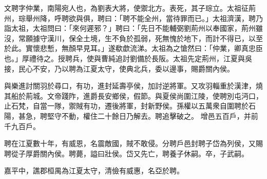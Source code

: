 \begin{pinyinscope}
 
 
 文聘字仲業，南陽宛人也，為劉表大將，使禦北方。表死，其子琮立。太祖征荊州，琮舉州降，呼聘欲與俱，聘曰：「聘不能全州，當待罪而已。」太祖濟漢，聘乃詣太祖，太祖問曰：「來何遲邪？」聘曰：「先日不能輔弼劉荊州以奉國家，荊州雖沒，常願據守漢川，保全土境，生不負於孤弱，死無愧於地下，而計不得已，以至於此。實懷悲慙，無顏早見耳。」遂欷歔流涕。太祖為之愴然曰：「仲業，卿真忠臣也。」厚禮待之。授聘兵，使與曹純追討劉備於長阪。太祖先定荊州，江夏與吳接，民心不安，乃以聘為江夏太守，使典北兵，委以邊事，賜爵關內侯。
 
 
 與樂進討關羽於尋口，有功，進封延壽亭侯，加討逆將軍。又攻羽輜重於漢津，燒其船於荊城。文帝踐阼，進爵長安鄉侯，假節。與夏侯尚圍江陵，使聘別屯沔口，止石梵，自當一隊，禦賊有功，遷後將軍，封新野侯。孫權以五萬衆自圍聘於石陽，甚急，聘堅守不動，權住二十餘日乃解去。聘追擊破之。
 增邑五百戶，并前千九百戶。
 
 
 
 
 聘在江夏數十年，有威恩，名震敵國，賊不敢侵。分聘戶邑封聘子岱為列侯，又賜聘從子厚爵關內侯。聘薨，謚曰壯侯。岱又先亡，聘養子休嗣。卒，子武嗣。
 
 
 
 
 嘉平中，譙郡桓禺為江夏太守，清儉有威惠，名亞於聘。
 
 
\end{pinyinscope}